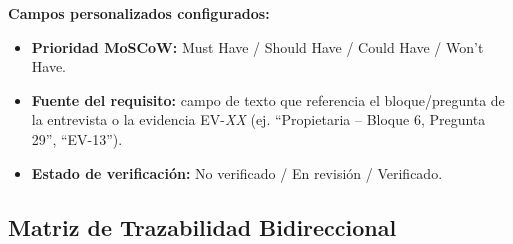 \documentclass[11pt,a4paper]{article}
\begin{document}
\textbf{Campos personalizados configurados:}
\begin{itemize}[nosep]
\item \textbf{Prioridad MoSCoW:} Must Have / Should Have / Could Have / Won't Have.
\item \textbf{Fuente del requisito:} campo de texto que referencia el bloque/pregunta de la entrevista o la evidencia EV-\textit{XX} (ej. “Propietaria -- Bloque 6, Pregunta 29”, “EV-13”).
\item \textbf{Estado de verificación:} No verificado / En revisión / Verificado.
\end{itemize}

\subsection{Matriz de Trazabilidad Bidireccional}
\end{document}
